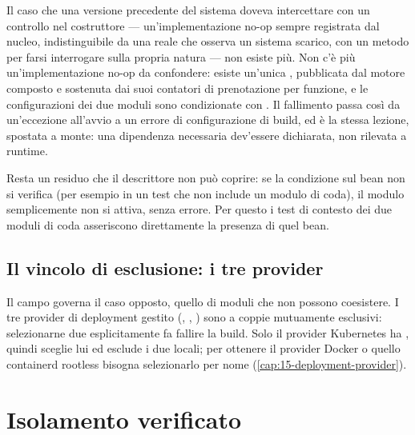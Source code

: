 Il caso che una versione precedente del sistema doveva intercettare con un
controllo nel costruttore --- un'implementazione no-op sempre registrata dal
nucleo, indistinguibile da una reale che osserva un sistema scarico, con un
metodo  per farsi interrogare sulla propria natura --- non
esiste pi\`u. Non c'\`e pi\`u un'implementazione no-op da confondere: esiste
un'unica , pubblicata dal motore composto e
sostenuta dai suoi contatori di prenotazione per funzione, e le configurazioni
dei due moduli sono condizionate con
. Il fallimento passa
cos\`i da un'eccezione all'avvio a un errore di configurazione di build, ed
\`e la stessa lezione, spostata a monte: una dipendenza necessaria dev'essere
dichiarata, non rilevata a runtime.

Resta un residuo che il descrittore non pu\`o coprire: se la condizione sul
bean non si verifica (per esempio in un test che non include un modulo di
coda), il modulo semplicemente non si attiva, senza errore. Per questo i test di
contesto dei due moduli di coda asseriscono direttamente la presenza di quel bean.

\subsection{Il vincolo di esclusione: i tre provider}

Il campo  governa il caso opposto, quello di moduli che non
possono coesistere. I tre provider di deployment gestito
(, ,
) sono a coppie mutuamente esclusivi:
selezionarne due esplicitamente fa fallire la build. Solo il provider
Kubernetes ha , quindi  sceglie lui ed
esclude i due locali; per ottenere il provider Docker o quello containerd
rootless bisogna selezionarlo per nome (\cref{cap:15-deployment-provider}).

\section{Isolamento verificato}

